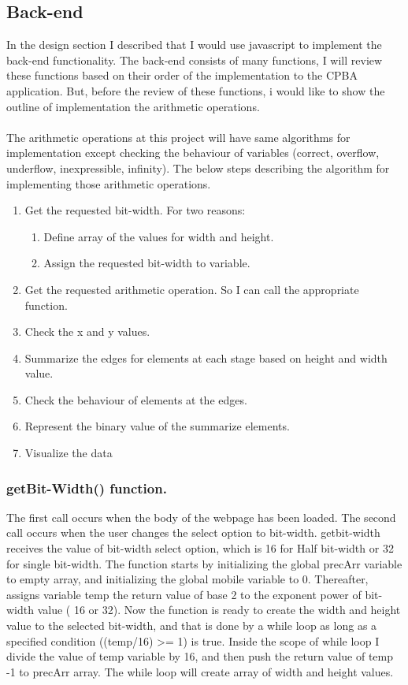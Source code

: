 \documentclass[11pt]{article}
\begin{document}
\subsection{Back-end}
In the design section I described that I would use javascript to implement the back-end functionality. The back-end consists of many functions, I will review these functions based on their order of the implementation to the CPBA application. But, before the review of these functions, i would like to show the outline of implementation the arithmetic operations.\\
\\The arithmetic operations at this project will have same algorithms for implementation except checking the behaviour of variables (correct, overflow, underflow, inexpressible, infinity). The below steps describing the algorithm for implementing those arithmetic operations.
\begin{enumerate}
\item Get the requested bit-width. For two reasons:
  \begin{enumerate}
    \item Define array of the values for width and height.
    \item Assign the requested bit-width to variable. 
  \end{enumerate}
\item Get the requested arithmetic operation. So I can call the appropriate function.
\item Check the x and y values.
\item Summarize the edges for elements at each stage based on height and width value.
\item Check the behaviour of elements at the edges.
\item Represent the binary value of the summarize elements.
\item Visualize the data
\end{enumerate}

\subsubsection{getBit-Width() function.}
The first call occurs when the body of the webpage has been loaded. The second call occurs when the user changes the select option to bit-width. getbit-width receives the value of bit-width select option, which is 16 for Half bit-width or 32 for single bit-width. The function starts by initializing the global precArr variable to empty array, and initializing the global mobile variable to 0. Thereafter, assigns variable temp the return value of base 2 to the exponent power of bit-width value ( 16 or 32).
Now the function is ready to create the width and height value to the selected bit-width, and that is done by a while loop as long as a specified condition ((temp/16) >= 1) is true. Inside the scope of while loop I divide the value of temp variable by 16, and then push the return value of temp -1 to precArr array. The while loop will create array of width and height values.\\
\end{document}
